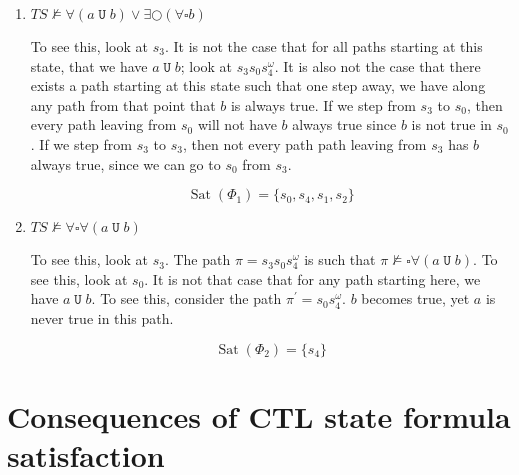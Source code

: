 \documentclass[letterpaper,11pt]{article}
\newcommand{\question}{\section}
\newcommand{\always}{\square}
\newcommand{\nmodels}{\nvDash}
\newcommand{\step}{\bigcirc}
\DeclareMathOperator{\untilOp}{\mathtt{U}}
\newcommand{\until}{\untilOp{}}
\newcommand{\parens}[1]{\left(#1\right)}
\DeclareMathOperator{\Sat}{Sat}
\newcommand{\sat}[1]{\Sat{\parens{#1}}}
\begin{document}
\begin{enumerate}
    \item $TS \nmodels \forall (a \until b) \lor \exists \step (\forall \always b)$

        To see this, look at $s_3$. It is not the case that for all paths
        starting at this state, that we have $a \until b$; look at
        $s_3 s_0 s_4^\omega$. It is also not the case that there exists a path
        starting at this state such that one step away, we have along any path
        from that point that $b$ is always true. If we step from $s_3$ to
        $s_0$, then every path leaving from $s_0$ will not have $b$ always true
        since $b$ is not true in $s_0$. If we step from $s_3$ to $s_3$, then
        not every path path leaving from $s_3$ has $b$ always true, since we
        can go to $s_0$ from $s_3$.

        \begin{equation*}
            \sat{\Phi_1} = \{ s_0, s_4, s_1, s_2 \}
        \end{equation*}

    \item $TS \nmodels \forall \always \forall (a \until b)$

        To see this, look at $s_3$. The path $\pi = s_3 s_0 s_4^\omega$
        is such that $\pi \nmodels \always \forall (a \until b)$. To see this,
        look at $s_0$. It is not that case that for any path starting here, we
        have $a \until b$. To see this, consider the path
        $\pi^\prime = s_0 s_4^\omega$. $b$ becomes true, yet $a$ is never true
        in this path.

        \begin{equation*}
            \sat{\Phi_2} = \{ s_4 \}
        \end{equation*}
\end{enumerate}

\question{Consequences of CTL state formula satisfaction}
\end{document}
